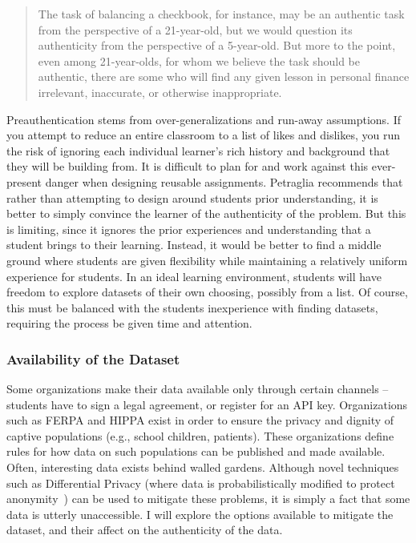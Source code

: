 \begin{quotation}
    The task of balancing a checkbook, for instance, may be an authentic task from the perspective of a 21-year-old, but we would question its authenticity from the perspective of a 5-year-old. But more to the point, even among 21-year-olds, for whom we believe the task should be authentic, there are some who will find any given lesson in personal finance irrelevant, inaccurate, or otherwise inappropriate. 
\end{quotation}
Preauthentication stems from over-generalizations and run-away assumptions.
If you attempt to reduce an entire classroom to a list of likes and dislikes, you run the risk of ignoring each individual learner's rich history and background that they will be building from. 
It is difficult to plan for and work against this ever-present danger when designing reusable assignments. 
Petraglia \cite{preauthentication} recommends that rather than attempting to design around students prior understanding, it is better to simply convince the learner of the authenticity of the problem.
But this is limiting, since it ignores the prior experiences and understanding that a student brings to their learning.
Instead, it would be better to find a middle ground where students are given flexibility while maintaining a relatively uniform experience for students.
In an ideal learning environment, students will have freedom to explore datasets of their own choosing, possibly from a list.
Of course, this must be balanced with the students inexperience with finding datasets, requiring the process be given time and attention.
	
\subsubsection{Availability of the Dataset}

Some organizations make their data available only through certain channels -- students have to sign a legal agreement, or register for an API key. Organizations such as FERPA and HIPPA exist in order to ensure the privacy and dignity of captive populations (e.g., school children, patients). These organizations define rules for how data on such populations can be published and made available. Often, interesting data exists behind walled gardens. Although novel techniques such as Differential Privacy (where data is probabilistically modified to protect anonymity~\cite{dwork2011differential}) can be used to mitigate these problems, it is simply a fact that some data is utterly unaccessible. I will explore the options available to mitigate the dataset, and their affect on the authenticity of the data.
	
